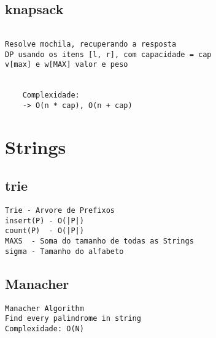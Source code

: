 \vspace{-2pt}
\subsection{knapsack}
\vspace{-4pt}
\begin{lstlisting}[style=description]

Resolve mochila, recuperando a resposta
DP usando os itens [l, r], com capacidade = cap
v[max] e w[MAX] valor e peso


    Complexidade:
    -> O(n * cap), O(n + cap)

\end{lstlisting}
\vspace{-5pt}
\raggedbottom
\hrulefill


\section{Strings}
\vspace{-2pt}
\subsection{trie}
\vspace{-4pt}
\begin{lstlisting}[style=description]
Trie - Arvore de Prefixos
insert(P) - O(|P|)
count(P)  - O(|P|)
MAXS  - Soma do tamanho de todas as Strings
sigma - Tamanho do alfabeto

\end{lstlisting}
\vspace{-5pt}
\raggedbottom
\hrulefill

\vspace{-2pt}
\subsection{Manacher}
\vspace{-4pt}
\begin{lstlisting}[style=description]
Manacher Algorithm
Find every palindrome in string
Complexidade: O(N)

\end{lstlisting}
\vspace{-5pt}
\raggedbottom
\hrulefill

\vspace{-2pt}
